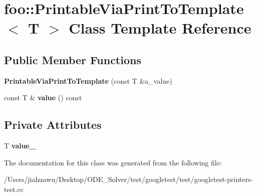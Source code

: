 \hypertarget{classfoo_1_1_printable_via_print_to_template}{}\section{foo\+:\+:Printable\+Via\+Print\+To\+Template$<$ T $>$ Class Template Reference}
\label{classfoo_1_1_printable_via_print_to_template}
\subsection*{Public Member Functions}
\begin{DoxyCompactItemize}
\item 
\mbox{\label{classfoo_1_1_printable_via_print_to_template_a8fef9e8b59c9415624230b73469b517e}} 
{\bfseries Printable\+Via\+Print\+To\+Template} (const T \&a\+\_\+value)
\item 
\mbox{\label{classfoo_1_1_printable_via_print_to_template_a14e0fcac9ae264e37e6212994b2920f6}} 
const T \& {\bfseries value} () const
\end{DoxyCompactItemize}
\subsection*{Private Attributes}
\begin{DoxyCompactItemize}
\item 
\mbox{\label{classfoo_1_1_printable_via_print_to_template_a7c6456772f6c908037b80d94f3367c63}} 
T {\bfseries value\+\_\+}
\end{DoxyCompactItemize}


The documentation for this class was generated from the following file\+:\begin{DoxyCompactItemize}
\item 
/\+Users/jiahuawu/\+Desktop/\+O\+D\+E\+\_\+\+Solver/test/googletest/test/googletest-\/printers-\/test.\+cc\end{DoxyCompactItemize}
